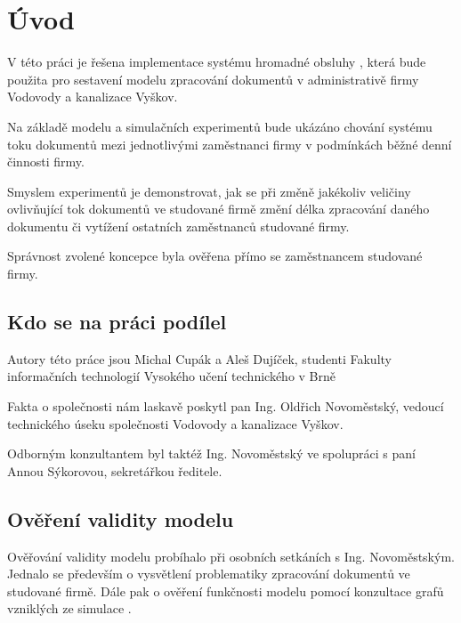 \documentclass[12pt,a4paper]{article}
\begin{document}



\section{Úvod}

V této práci je řešena implementace systému hromadné obsluhy \cite{ims-sho}, která bude použita pro 
sestavení modelu \cite{ims-zakladni-pojmy} zpracování dokumentů v administrativě firmy Vodovody a kanalizace Vyškov.

Na základě modelu a simulačních experimentů bude ukázáno 
chování systému \cite{ims-chovani-systemu} toku dokumentů mezi jednotlivými zaměstnanci firmy v podmínkách běžné denní činnosti firmy.

Smyslem experimentů je demonstrovat, jak se při změně jakékoliv veličiny ovlivňující tok dokumentů ve studované firmě změní délka zpracování daného dokumentu či vy\-tí\-že\-ní ostatních zaměstnanců studované firmy.

Správnost zvolené koncepce byla ověřena přímo se zaměstnancem studované firmy.


\subsection{Kdo se na práci podílel}
Autory této práce jsou Michal Cupák a Aleš Dujíček, studenti Fakulty informačních technologií Vysokého učení technického v Brně

Fakta o společnosti nám laskavě poskytl pan Ing. Oldřich Novoměstský, vedoucí technického úseku společnosti Vodovody a kanalizace Vyškov.

Odborným konzultantem byl taktéž Ing. Novoměstský ve spolupráci s paní Annou Sý\-ko\-ro\-vou, se\-kre\-tář\-kou ředitele.

\subsection{Ověření validity modelu}
Ověřování validity modelu probíhalo při osobních setkáních s Ing. Novoměstským. Jednalo se především o vysvětlení problematiky zpracování dokumentů ve studované firmě. Dále pak o ověření funkčnosti modelu pomocí konzultace grafů vzniklých ze simulace \cite{ims-zakladni-pojmy}.
\end{document}
